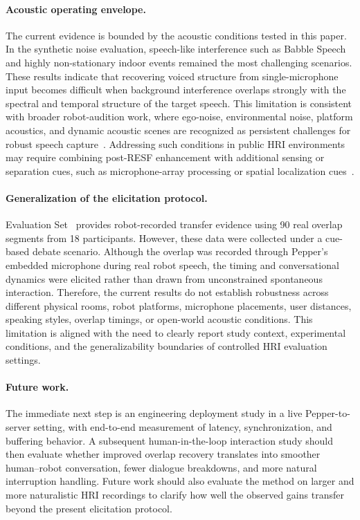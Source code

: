 \documentclass[manuscript,screen,review]{acmart}
\newcommand{\RomanNumeralCaps}[1]
    {\MakeUppercase{\romannumeral #1}}
\begin{document}
\paragraph{Acoustic operating envelope.}
The current evidence is bounded by the acoustic conditions tested in this paper. In the synthetic noise evaluation, speech-like interference such as Babble Speech and highly non-stationary indoor events remained the most challenging scenarios. These results indicate that recovering voiced structure from single-microphone input becomes difficult when background interference overlaps strongly with the spectral and temporal structure of the target speech. This limitation is consistent with broader robot-audition work, where ego-noise, environmental noise, platform acoustics, and dynamic acoustic scenes are recognized as persistent challenges for robust speech capture~\cite{10096344}. Addressing such conditions in public HRI environments may require combining post-RESF enhancement with additional sensing or separation cues, such as microphone-array processing or spatial localization cues~\cite{nakadai2012robot}.

\paragraph{Generalization of the elicitation protocol.}
Evaluation Set~\RomanNumeralCaps{3} provides robot-recorded transfer evidence using 90 real overlap segments from 18 participants. However, these data were collected under a cue-based debate scenario. Although the overlap was recorded through Pepper's embedded microphone during real robot speech, the timing and conversational dynamics were elicited rather than drawn from unconstrained spontaneous interaction. Therefore, the current results do not establish robustness across different physical rooms, robot platforms, microphone placements, user distances, speaking styles, overlap timings, or open-world acoustic conditions. This limitation is aligned with the need to clearly report study context, experimental conditions, and the generalizability boundaries of controlled HRI evaluation settings.

\paragraph{Future work.}
The immediate next step is an engineering deployment study in a live Pepper-to-server setting, with end-to-end measurement of latency, synchronization, and buffering behavior. A subsequent human-in-the-loop interaction study should then evaluate whether improved overlap recovery translates into smoother human--robot conversation, fewer dialogue breakdowns, and more natural interruption handling. Future work should also evaluate the method on larger and more naturalistic HRI recordings to clarify how well the observed gains transfer beyond the present elicitation protocol.
\end{document}
